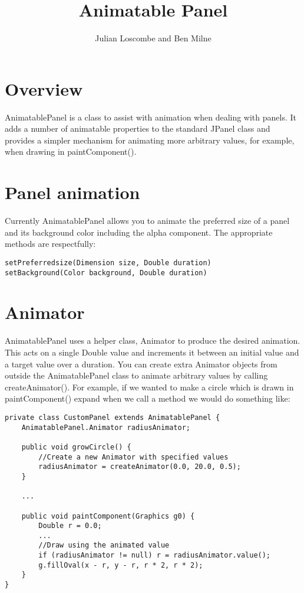 \documentclass[a4paper, 12pt]{article}
\title{Animatable Panel}
\author{Julian Loscombe and Ben Milne}
\begin{document}
\maketitle 
\section{Overview}
AnimatablePanel is a class to assist with animation when dealing with panels. It adds a number of animatable properties to the standard JPanel class and provides a simpler mechanism for animating more arbitrary values, for example, when drawing in paintComponent().
\section{Panel animation}
Currently AnimatablePanel allows you to animate the preferred size of a panel and its background color including the alpha component. The appropriate methods are respectfully:\\
\begin{lstlisting}
setPreferredsize(Dimension size, Double duration)
setBackground(Color background, Double duration)
\end{lstlisting}
\section{Animator}
AnimatablePanel uses a helper class, Animator to produce the desired animation. This acts on a single Double value and increments it between an initial value and a target value over a duration. You can create extra Animator objects from outside the AnimatablePanel class to animate arbitrary values by calling createAnimator(). For example, if we wanted to make a circle which is drawn in paintComponent() expand when we call a method we would do something like:\\
\begin{lstlisting}
private class CustomPanel extends AnimatablePanel {
	AnimatablePanel.Animator radiusAnimator;
	
	public void growCircle() {
		//Create a new Animator with specified values
		radiusAnimator = createAnimator(0.0, 20.0, 0.5);
	}
	
	...
	
	public void paintComponent(Graphics g0) {
		Double r = 0.0;
		...
		//Draw using the animated value
		if (radiusAnimator != null) r = radiusAnimator.value();
		g.fillOval(x - r, y - r, r * 2, r * 2);
	}
}
\end{lstlisting}
\pagebreak
\end{document}

